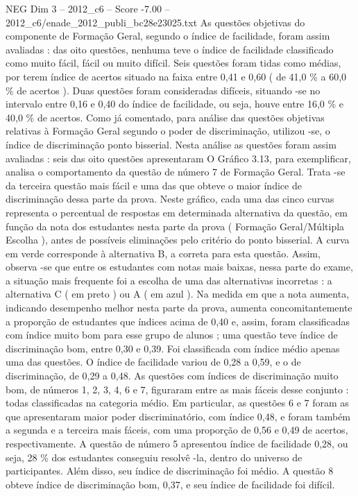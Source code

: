 \begin{textsample}{NEG Dim 3 – 2012\_c6 – Score -7.00 – 2012\_c6/enade\_2012\_publi\_bc28e23025.txt}
As questões objetivas do componente de Formação Geral, segundo o índice de facilidade, foram assim avaliadas : das oito questões, nenhuma teve o índice de facilidade classificado como muito fácil, fácil ou muito difícil.
Seis questões foram tidas como médias, por terem índice de acertos situado na faixa entre 0,41 e 0,60 ( de 41,0 \% a 60,0 \% de acertos ).
Duas questões foram consideradas difíceis, situando -se no intervalo entre 0,16 e 0,40 do índice de facilidade, ou seja, houve entre 16,0 \% e 40,0 \% de acertos.
Como já comentado, para análise das questões objetivas relativas à Formação Geral segundo o poder de discriminação, utilizou -se, o índice de discriminação ponto bisserial.
Nesta análise as questões foram assim avaliadas : seis das oito questões apresentaram O Gráfico 3.13, para exemplificar, analisa o comportamento da questão de número 7 de Formação Geral.
Trata -se da terceira questão mais fácil e uma das que obteve o maior índice de discriminação dessa parte da prova.
Neste gráfico, cada uma das cinco curvas representa o percentual de respostas em determinada alternativa da questão, em função da nota dos estudantes nesta parte da prova ( Formação Geral/Múltipla Escolha ), antes de possíveis eliminações pelo critério do ponto bisserial.
A curva em verde corresponde à alternativa B, a correta para esta questão.
Assim, observa -se que entre os estudantes com notas mais baixas, nessa parte do exame, a situação mais frequente foi a escolha de uma das alternativas incorretas : a alternativa C ( em preto ) ou A ( em azul ).
Na medida em que a nota aumenta, indicando desempenho melhor nesta parte da prova, aumenta concomitantemente a proporção de estudantes que índices acima de 0,40 e, assim, foram classificadas com índice muito bom para esse grupo de alunos ; uma questão teve índice de discriminação bom, entre 0,30 e 0,39.
Foi classificada com índice médio apenas uma das questões.
O índice de facilidade variou de 0,28 a 0,59, e o de discriminação, de 0,29 a 0,48.
As questões com índices de discriminação muito bom, de números 1, 2, 3, 4, 6 e 7, figuraram entre as mais fáceis desse conjunto : todas classificadas na categoria médio.
Em particular, as questões 6 e 7 foram as que apresentaram maior poder discriminatório, com índice 0,48, e foram também a segunda e a terceira mais fáceis, com uma proporção de 0,56 e 0,49 de acertos, respectivamente.
A questão de número 5 apresentou índice de facilidade 0,28, ou seja, 28 \% dos estudantes conseguiu resolvê -la, dentro do universo de participantes.
Além disso, seu índice de discriminação foi médio.
A questão 8 obteve índice de discriminação bom, 0,37, e seu índice de facilidade foi difícil.

\end{textsample}
